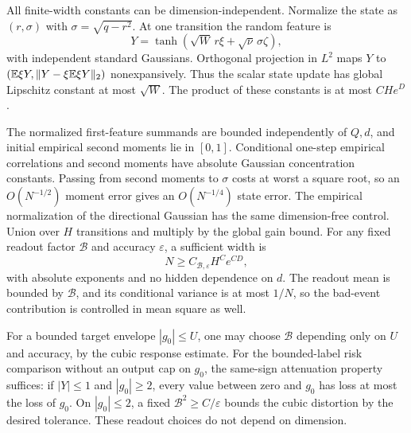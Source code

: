 All finite-width constants can be dimension-independent. Normalize the state as $(r,\sigma)$ with $\sigma=\sqrt{q-r^2}$. At one transition the random feature is
\[
 Y=\tanh(\sqrt W\,r\xi+\sqrt\nu\,\sigma\zeta),
\]
with independent standard Gaussians. Orthogonal projection in $L^2$ maps $Y$ to
$(\mathbb E\xi Y,\|Y-\xi\mathbb E\xi Y\|_2)$ nonexpansively. Thus the scalar state update has global Lipschitz constant at most $\sqrt W$. The product of these constants is at most $CHe^D$.

The normalized first-feature summands are bounded independently of $Q,d$, and initial empirical second moments lie in $[0,1]$. Conditional one-step empirical correlations and second moments have absolute Gaussian concentration constants. Passing from second moments to $\sigma$ costs at worst a square root, so an $O(N^{-1/2})$ moment error gives an $O(N^{-1/4})$ state error. The empirical normalization of the directional Gaussian has the same dimension-free control. Union over $H$ transitions and multiply by the global gain bound. For any fixed readout factor $\mathcal B$ and accuracy $\varepsilon$, a sufficient width is
\[
 N\ge C_{\mathcal B,\varepsilon}H^C e^{CD},
\]
with absolute exponents and no hidden dependence on $d$. The readout mean is bounded by $\mathcal B$, and its conditional variance is at most $1/N$, so the bad-event contribution is controlled in mean square as well.

For a bounded target envelope $|g_0|\le U$, one may choose $\mathcal B$ depending only on $U$ and accuracy, by the cubic response estimate. For the bounded-label risk comparison without an output cap on $g_0$, the same-sign attenuation property suffices: if $|Y|\le1$ and $|g_0|\ge2$, every value between zero and $g_0$ has loss at most the loss of $g_0$. On $|g_0|\le2$, a fixed $\mathcal B^2\ge C/\varepsilon$ bounds the cubic distortion by the desired tolerance. These readout choices do not depend on dimension.
